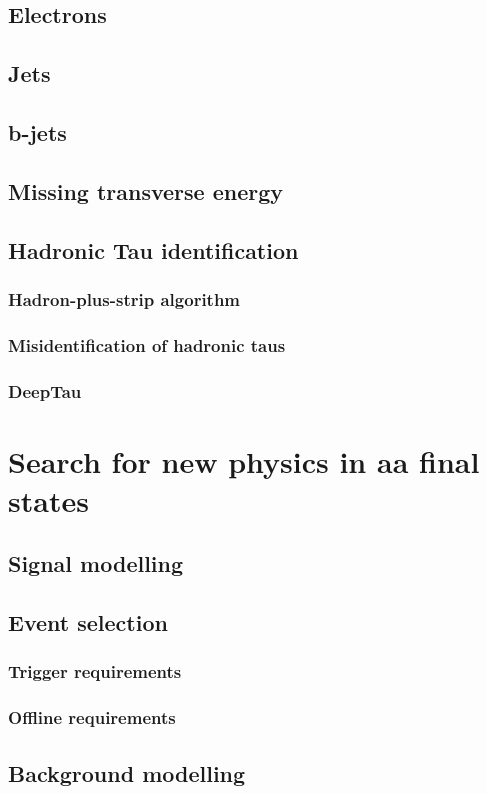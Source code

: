 \documentclass[12pt, a4paper, twoside]{report}
\begin{document}
\section{Electrons}
\section{Jets}
\section{b-jets}
\section{Missing transverse energy}
\section{Hadronic Tau identification}
\subsection{Hadron-plus-strip algorithm}
\subsection{Misidentification of hadronic taus}
\subsection{DeepTau}

\chapter{Search for new physics in aa final states}
\section{Signal modelling}
\section{Event selection}
\subsection{Trigger requirements}
\subsection{Offline requirements}
\section{Background modelling}
\end{document}
